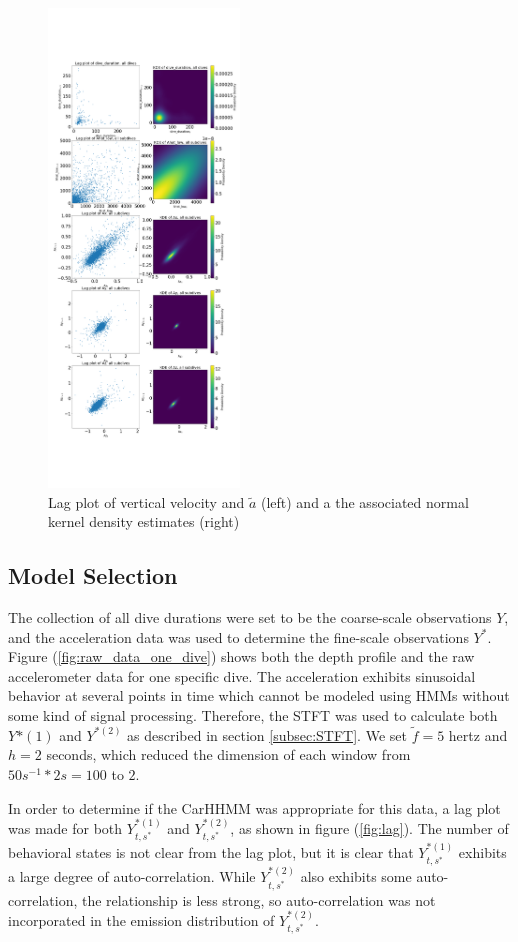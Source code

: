 \begin{figure}[h!]
	\centering
	\includegraphics[height=5in]{../Plots/lagplot.png}
	\caption{Lag plot of vertical velocity and $\tilde a$ (left) and a the associated normal kernel density estimates (right)}
	\label{fig:data_one_dive}
\end{figure}

\subsection{Model Selection}

The collection of all dive durations were set to be the coarse-scale observations $Y$, and the acceleration data was used to determine the fine-scale observations $Y^*$. Figure (\ref{fig:raw_data_one_dive}) shows both the depth profile and the raw accelerometer data for one specific dive. The acceleration exhibits sinusoidal behavior at several points in time which cannot be modeled using HMMs without some kind of signal processing. Therefore, the STFT was used to calculate both $Y{*(1)}$ and $Y^{*(2)}$ as described in section \ref{subsec:STFT}. We set $\tilde{f} = 5$ hertz and $h = 2$ seconds, which reduced the dimension of each window from $50 s^{-1} * 2 s = 100$ to $2$.

In order to determine if the CarHHMM was appropriate for this data, a lag plot was made for both $Y^{*(1)}_{t,s^*}$ and $Y^{*(2)}_{t,s^*}$, as shown in figure (\ref{fig:lag}). The number of behavioral states is not clear from the lag plot, but it is clear that $Y^{*(1)}_{t,s^*}$ exhibits a large degree of auto-correlation. While $Y^{*(2)}_{t,s^*}$ also exhibits some auto-correlation, the relationship is less strong, so auto-correlation was not incorporated in the emission distribution of $Y^{*(2)}_{t,s^*}$. 

